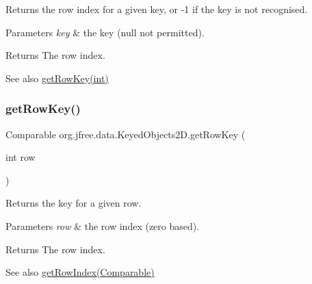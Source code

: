 Returns the row index for a given key, or {\ttfamily -\/1} if the key is not recognised.


\begin{DoxyParams}{Parameters}
{\em key} & the key ({\ttfamily null} not permitted).\\
\hline
\end{DoxyParams}
\begin{DoxyReturn}{Returns}
The row index.
\end{DoxyReturn}
\begin{DoxySeeAlso}{See also}
\mbox{\hyperlink{classorg_1_1jfree_1_1data_1_1_keyed_objects2_d_a9cf0ed520988bdc2ad943e2c1c941f79}{get\+Row\+Key(int)}} 
\end{DoxySeeAlso}
\mbox{\label{classorg_1_1jfree_1_1data_1_1_keyed_objects2_d_a9cf0ed520988bdc2ad943e2c1c941f79}} 
\subsubsection{\texorpdfstring{get\+Row\+Key()}{getRowKey()}}
{\footnotesize\ttfamily Comparable org.\+jfree.\+data.\+Keyed\+Objects2\+D.\+get\+Row\+Key (\begin{DoxyParamCaption}\item[{int}]{row }\end{DoxyParamCaption})}

Returns the key for a given row.


\begin{DoxyParams}{Parameters}
{\em row} & the row index (zero based).\\
\hline
\end{DoxyParams}
\begin{DoxyReturn}{Returns}
The row index.
\end{DoxyReturn}
\begin{DoxySeeAlso}{See also}
\mbox{\hyperlink{classorg_1_1jfree_1_1data_1_1_keyed_objects2_d_aa1d3953e9bfcce6c2ec64fc38bbe380d}{get\+Row\+Index(\+Comparable)}} 
\end{DoxySeeAlso}
\mbox{\label{classorg_1_1jfree_1_1data_1_1_keyed_objects2_d_ac800d5499d80a223b6f82adadda2066e}} 
